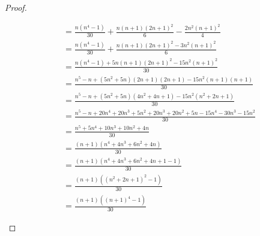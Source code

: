 \documentclass{exam}
\begin{document}
\begin{proof}
\begin{enumerate}
\begin{align}
			                                        & = \frac{n(n^4 - 1)}{30} + \frac{n(n+1)(2n+1)^2}{6} - \frac{2n^2(n+1)^2}{4}                                \\
			                                        & = \frac{n(n^4 - 1)}{30} + \frac{n(n+1)(2n+1)^2 - 3n^2(n+1)^2}{6}                                          \\
			                                        & = \frac{n(n^4 - 1) + 5n(n+1)(2n+1)^2 - 15n^2(n+1)^2}{30}                                                  \\
			                                        & = \frac{n^5 - n + (5n^2+5n)(2n+1)(2n+1) - 15n^2(n+1)(n+1)}{30}                                            \\
			                                        & = \frac{n^5 - n + (5n^2+5n)(4n^2 + 4n +1) - 15n^2(n^2 + 2n +1)}{30}                                       \\
			                                        & = \frac{n^5 - n + 20n^4 + 20n^3 + 5n^2 + 20n^3 + 20n^2 + 5n - 15n^4- 30n^3 - 15n^2}{30}                   \\
			                                        & = \frac{n^5 + 5n^4 + 10n^3 + 10n^2 + 4n}{30}                                                              \\
			                                        & = \frac{(n+1)(n^4+4n^3+6n^2+4n)}{30} \tag{Polynomdivision}                                                \\
			                                        & = \frac{(n+1)(n^4+4n^3+6n^2+4n + 1 - 1)}{30}                                                              \\
			                                        & = \frac{(n+1)((n^2 + 2n +1)^2 - 1)}{30}                                                                   \\
			                                        & = \frac{(n+1)((n + 1)^4 - 1)}{30}
		      \end{align}
	\end{enumerate}
\end{proof}

\pagebreak
\end{document}
